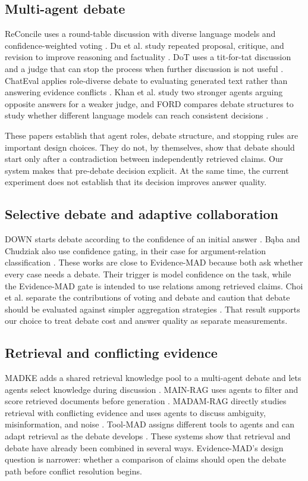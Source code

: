 \documentclass[conference]{IEEEtran}
\begin{document}
\subsection{Multi-agent debate}
ReConcile uses a round-table discussion with diverse language models and confidence-weighted voting \cite{chen2024reconcile}. Du et al. study repeated proposal, critique, and revision to improve reasoning and factuality \cite{du2024icml}. DoT uses a tit-for-tat discussion and a judge that can stop the process when further discussion is not useful \cite{liang2024dot}. ChatEval applies role-diverse debate to evaluating generated text rather than answering evidence conflicts \cite{chan2024chateval}. Khan et al. study two stronger agents arguing opposite answers for a weaker judge, and FORD compares debate structures to study whether different language models can reach consistent decisions \cite{khan2024persuasive,xiong2023ford}.

These papers establish that agent roles, debate structure, and stopping rules are important design choices. They do not, by themselves, show that debate should start only after a contradiction between independently retrieved claims. Our system makes that pre-debate decision explicit. At the same time, the current experiment does not establish that its decision improves answer quality.

\subsection{Selective debate and adaptive collaboration}
DOWN starts debate according to the confidence of an initial answer \cite{eo2025down}. B\k{a}ba and Chudziak also use confidence gating, in their case for argument-relation classification \cite{baba2026confidence}. These works are close to Evidence-MAD because both ask whether every case needs a debate. Their trigger is model confidence on the task, while the Evidence-MAD gate is intended to use relations among retrieved claims. Choi et al. separate the contributions of voting and debate and caution that debate should be evaluated against simpler aggregation strategies \cite{choi2025debate}. That result supports our choice to treat debate cost and answer quality as separate measurements.

\subsection{Retrieval and conflicting evidence}
MADKE adds a shared retrieval knowledge pool to a multi-agent debate and lets agents select knowledge during discussion \cite{wang2025madke}. MAIN-RAG uses agents to filter and score retrieved documents before generation \cite{chang2025mainrag}. MADAM-RAG directly studies retrieval with conflicting evidence and uses agents to discuss ambiguity, misinformation, and noise \cite{wang2025madamrag}. Tool-MAD assigns different tools to agents and can adapt retrieval as the debate develops \cite{jeong2026toolmad}. These systems show that retrieval and debate have already been combined in several ways. Evidence-MAD's design question is narrower: whether a comparison of claims should open the debate path before conflict resolution begins.
\end{document}
